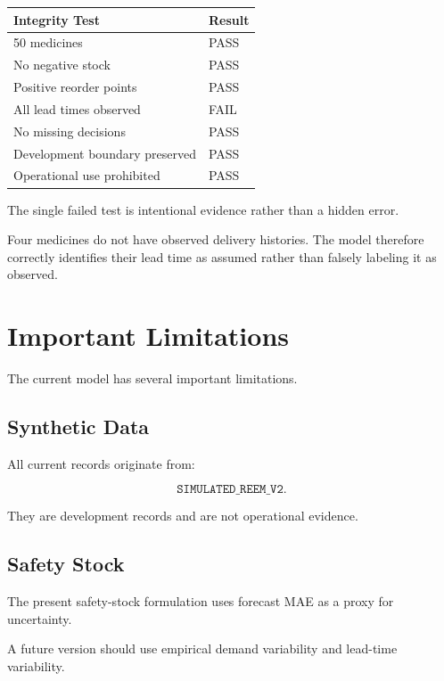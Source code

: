 \documentclass[11pt,a4paper]{article}
\begin{document}
\begin{center}
\begin{tabular}{ll}
\toprule
\textbf{Integrity Test} & \textbf{Result}\\
\midrule
50 medicines & PASS\\
No negative stock & PASS\\
Positive reorder points & PASS\\
All lead times observed & FAIL\\
No missing decisions & PASS\\
Development boundary preserved & PASS\\
Operational use prohibited & PASS\\
\bottomrule
\end{tabular}
\end{center}

The single failed test is intentional evidence rather than a hidden
error.

Four medicines do not have observed delivery histories. The model
therefore correctly identifies their lead time as assumed rather
than falsely labeling it as observed.

\section{Important Limitations}

The current model has several important limitations.

\subsection{Synthetic Data}

All current records originate from:

\[
\texttt{SIMULATED\_REEM\_V2}.
\]

They are development records and are not operational evidence.

\subsection{Safety Stock}

The present safety-stock formulation uses forecast MAE as a proxy
for uncertainty.

A future version should use empirical demand variability and
lead-time variability.
\end{document}
